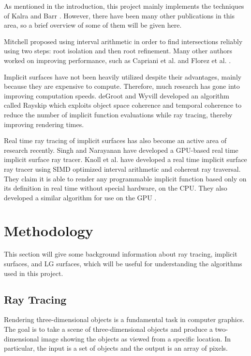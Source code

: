 \documentclass[conference]{acmsiggraph}
\begin{document}
As mentioned in the introduction, this project mainly implements the
techniques of Kalra and Barr \cite{KalraBarr1989}.  However, there have
been many other publications in this area, so a brief overview of some
of them will be given here.

Mitchell \cite{MitchellIntervals} proposed using interval arithmetic 
in order to find intersections reliably using two steps: root isolation
and then root refinement.  Many other authors worked on improving
performance, such as Capriani et al. \cite{CaprianiIntervals} and
Florez et al. \cite{FlorezIntervals}.

Implicit surfaces have not been heavily utilized despite their advantages,
mainly because they are expensive to compute.  Therefore, much research
has gone into improving computation speeds.  deGroot and Wyvill
\cite{deGrootWyvill} developed an algorithm called Rayskip which
exploits object space coherence and temporal coherence to reduce the
number of implicit function evaluations while ray tracing, thereby
improving rendering times.

Real time ray tracing of implicit surfaces has also become an active
area of research recently.  Singh and Narayanan \cite{RealTimeGPU} 
have developed a GPU-based real time implicit surface ray tracer.
Knoll et al. \cite{RealTimeIntervals} have developed 
a real time implicit surface ray tracer using SIMD optimized interval 
arithmetic and coherent ray traversal.  They claim it is able to
render any programmable implicit function based only on its definition
in real time without special hardware, on the CPU.  They also developed
a similar algorithm for use on the GPU \cite{RealTimeIntervals2}.

\section{Methodology}

This section will give some background information about ray tracing,
implicit surfaces, and LG surfaces, which will be useful for 
understanding the algorithms used in this project.

\subsection{Ray Tracing}

Rendering three-dimensional objects is a fundamental task in computer 
graphics.  The goal is to take a scene of three-dimensional objects 
and produce a two-dimensional image showing the objects as viewed
from a specific location.  In particular, the input is a set of 
objects and the output is an array of pixels.
\end{document}
